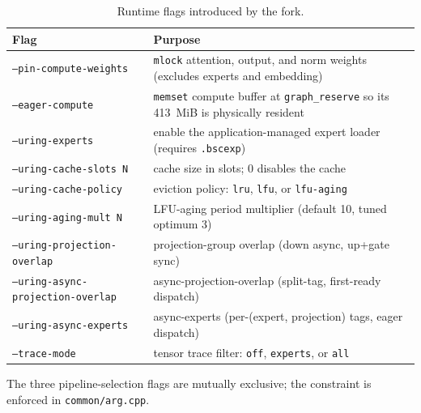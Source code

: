 \begin{table}[htbp]
\caption{Runtime flags introduced by the fork.}
\label{tab:runtime-flags}
\centering
\small
\begin{tabular}{@{}lp{8.0cm}@{}}
\toprule
Flag & Purpose \\
\midrule
\texttt{--pin-compute-weights} & \texttt{mlock} attention, output, and norm weights (excludes experts and embedding) \\
\texttt{--eager-compute} & \texttt{memset} compute buffer at \texttt{graph\_reserve} so its 413~MiB is physically resident \\
\texttt{--uring-experts} & enable the application-managed expert loader (requires \texttt{.bscexp}) \\
\texttt{--uring-cache-slots N} & cache size in slots; 0 disables the cache \\
\texttt{--uring-cache-policy} & eviction policy: \texttt{lru}, \texttt{lfu}, or \texttt{lfu-aging} \\
\texttt{--uring-aging-mult N} & LFU-aging period multiplier (default 10, tuned optimum 3) \\
\texttt{--uring-projection-overlap} & projection-group overlap (down async, up+gate sync) \\
\texttt{--uring-async-projection-overlap} & async-projection-overlap (split-tag, first-ready dispatch) \\
\texttt{--uring-async-experts} & async-experts (per-(expert, projection) tags, eager dispatch) \\
\texttt{--trace-mode} & tensor trace filter: \texttt{off}, \texttt{experts}, or \texttt{all} \\
\bottomrule
\end{tabular}
\end{table}

The three pipeline-selection flags are mutually exclusive; the constraint is enforced in \texttt{common/arg.cpp}.


